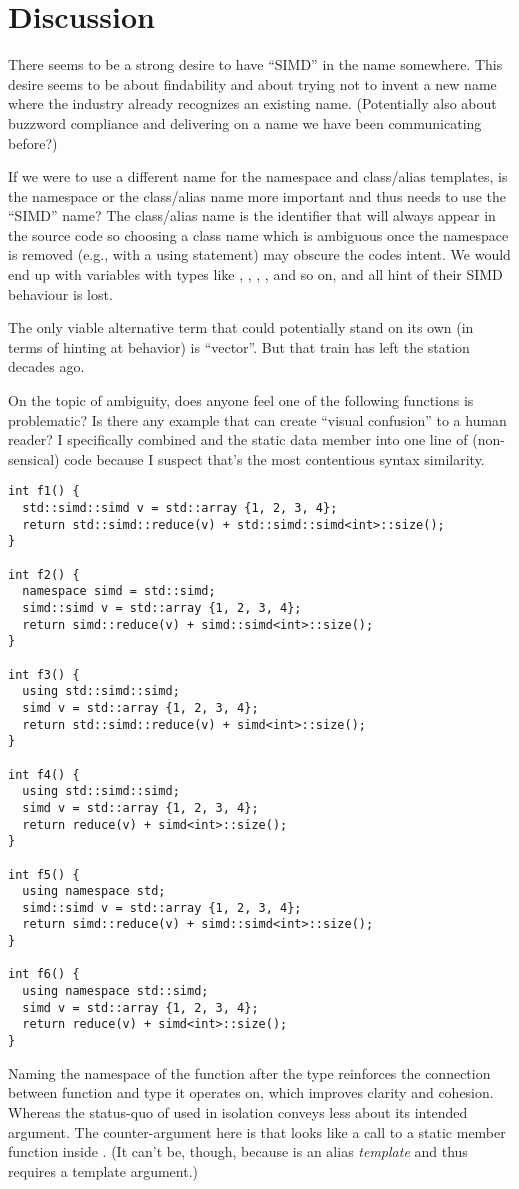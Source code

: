 \section{Discussion}

There seems to be a strong desire to have “SIMD” in the name somewhere.
This desire seems to be about findability and about trying not to invent a new name where the
industry already recognizes an existing name.
(Potentially also about buzzword compliance and delivering on a name we have been communicating
before?)

If we were to use a different name for the namespace and class/alias templates, is the namespace
or the class/alias name more important and thus needs to use the “SIMD” name?
The class/alias name is the identifier that will always appear in the source code so choosing a
class name which is ambiguous once the namespace is removed (e.g., with a using statement) may obscure
the codes intent.
We would end up with variables with types like , , ,
, and so on, and all hint of their SIMD behaviour is lost.

The only viable alternative term that could potentially stand on its own (in terms of hinting at
behavior) is “vector”.
But that train has left the station decades ago.

On the topic of ambiguity, does anyone feel one of the following functions is problematic?
Is there any example that can create “visual confusion” to a human reader?
I specifically combined  and the static data member  into one line of
(non-sensical) code because I suspect that's the most contentious syntax similarity.
\medskip\begin{lstlisting}[style=Vc]
int f1() {
  std::simd::simd v = std::array {1, 2, 3, 4};
  return std::simd::reduce(v) + std::simd::simd<int>::size();
}

int f2() {
  namespace simd = std::simd;
  simd::simd v = std::array {1, 2, 3, 4};
  return simd::reduce(v) + simd::simd<int>::size();
}

int f3() {
  using std::simd::simd;
  simd v = std::array {1, 2, 3, 4};
  return std::simd::reduce(v) + simd<int>::size();
}

int f4() {
  using std::simd::simd;
  simd v = std::array {1, 2, 3, 4};
  return reduce(v) + simd<int>::size();
}

int f5() {
  using namespace std;
  simd::simd v = std::array {1, 2, 3, 4};
  return simd::reduce(v) + simd::simd<int>::size();
}

int f6() {
  using namespace std::simd;
  simd v = std::array {1, 2, 3, 4};
  return reduce(v) + simd<int>::size();
}
\end{lstlisting}
Naming the namespace of the  function after the type reinforces the
connection between function and type it operates on, which improves clarity and cohesion.
Whereas the status-quo of \stddatapar{} used in isolation conveys less about its intended
argument.
The counter-argument here is that  looks like a call to a static member function
inside . (It can't be, though, because  is an alias \emph{template} and thus
requires a template argument.)

